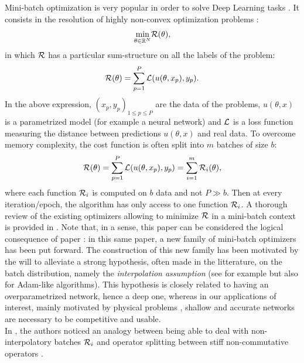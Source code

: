  
Mini-batch optimization is very popular in order to solve Deep Learning tasks \cite{image_recognition,language_recognition,plasma}. 
It consists in the resolution of highly non-convex optimization problems \cite{DL_opti}:
\begin{equation*}
\displaystyle{\min_{\theta \in \mathbb{R}^N}} \mathcal{R}(\theta),
\end{equation*}
in which $\mathcal{R}$ has a particular sum-structure on all the labels of the problem:
\begin{equation*}
	\mathcal{R}(\theta) = \displaystyle{\sum_{p=1}^{P} \mathcal{L}(u(\theta,x_p), y_p)}.
\end{equation*}
In the above expression, $(x_p,y_p)_{1\leq p \leq P}$ are the data of the problems, $u(\theta,x)$ is a parametrized model (for example a neural network) and $\mathcal{L}$ is a loss function measuring the distance between predictions $u(\theta,x)$ and real data. 
To overcome memory complexity, the cost function is often split into $m$ batches of size $b$:
\begin{equation}
	\mathcal{R}(\theta) = \displaystyle{\sum_{p=1}^{P} \mathcal{L}(u(\theta,x_p), y_p)} = \sum_{i=1}^m \mathcal{R}_i(\theta),
	\label{pb_somme_fini}
\end{equation}
where each function $\mathcal{R}_i$ is computed on $b$ data and not $P \gg b$. 
Then at every iteration/epoch, the algorithm has only access to one function $\mathcal{R}_i$.
A thorough review of the existing optimizers allowing to minimize $\mathcal{R}$ in a mini-batch context is provided in \cite{partI}. 
Note that, in a sense, this paper can be considered the
logical consequence of paper \cite{partI}: 
in this same paper, a new family of mini-batch optimizers has been put forward. 
The construction of this new family has been motivated by the will to alleviate a strong hypothesis, often made in the litterature, 
on the batch distribution, namely the {\em interpolation assumption} (see \cite{ESG_upper_bound,ESG_IG} for example but also  \cite{sgd_prec,adam1,adam2,zou_rms,rms_not_bounded}
for Adam-like algorithms).
This hypothesis is closely related to having an overparametrized network, hence a deep one, whereas 
in our applications of interest, mainly motivated by physical problems \cite{FV_scheme,reentry,acc_newt,FRANCK,plasma,KluthRipoll}, shallow and accurate networks are necessary to
be competitive and usable.\\
In \cite{partI}, the authors noticed an analogy between being able to deal with non-interpolatory batches $\mathcal{R}_i$ and operator splitting between stiff non-commutative operators \cite{rebalanced_splitting}. 
